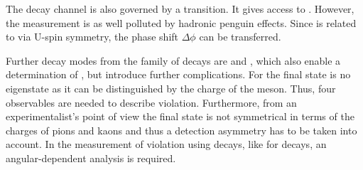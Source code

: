 The decay channel \BsToDsDs is also governed by a \bToccbard transition. It
gives access to \phis. However, the measurement is as well polluted by
hadronic penguin effects. Since \BsToDsDs is related to \BdToDD via U-spin
symmetry, the phase shift $\Delta\phi$ can be transferred.

Further decay modes from the family of \BToDDbar decays are \BdToDstD and
\BdToDstDst, which also enable a determination of \phideff, but introduce
further complications. For \BdToDstD the final state is no \CP eigenstate as
it can be distinguished by the charge of the \Dstarpm meson. Thus, four \CP
observables are needed to describe \CP violation. Furthermore, from an
experimentalist's point of view the final state is not symmetrical in terms of
the charges of pions and kaons and thus a detection asymmetry has to be taken
into account. In the measurement of \CP violation using \BdToDstDst decays,
like for \BsToJPsiPhi decays, an angular-dependent analysis is required.
